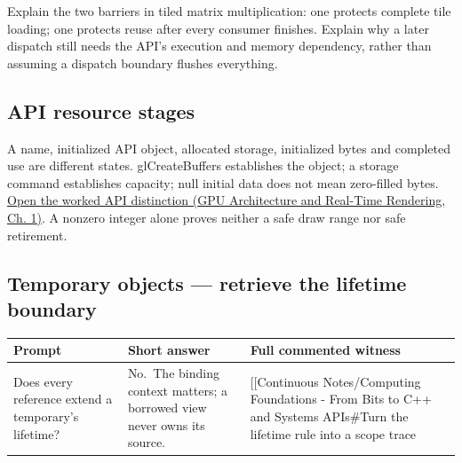 Explain the two barriers in tiled matrix multiplication: one protects complete tile loading; one protects reuse after every consumer finishes. Explain why a later dispatch still needs the API's execution and memory dependency, rather than assuming a dispatch boundary flushes everything.

\subsection{API resource stages}\label{appendix-960160274237-api-resource-stages}

A name, initialized API object, allocated storage, initialized bytes and completed use are different states. glCreateBuffers establishes the object; a storage command establishes capacity; null initial data does not mean zero-filled bytes. \href{../06-GPU-Architecture-and-Real-Time-Rendering/main.pdf\#nameddest=01-foundations-i-ch008-a-buffer-name-an-api-object-and-its-storage-are-separate}{Open the worked API distinction (GPU Architecture and Real-Time Rendering, Ch. 1)}. A nonzero integer alone proves neither a safe draw range nor safe retirement.

\subsection{Temporary objects --- retrieve the lifetime boundary}\label{appendix-960160274237-temporary-objects-retrieve-the-lifetime-boundary}

{\def\LTcaptype{none} %
\begin{longtable}[]{@{}
  >{\raggedright\arraybackslash}p{}
  >{\raggedright\arraybackslash}p{}
  >{\raggedright\arraybackslash}p{}@{}}
\toprule\noalign{}
\begin{minipage}[b]{\linewidth}\raggedright
Prompt
\end{minipage} & \begin{minipage}[b]{\linewidth}\raggedright
Short answer
\end{minipage} & \begin{minipage}[b]{\linewidth}\raggedright
Full commented witness
\end{minipage} \\
\midrule\noalign{}
\endhead
\bottomrule\noalign{}
\endlastfoot
Does every reference extend a temporary's lifetime? & No.~The binding context matters; a borrowed view never owns its source. & {[}{[}Continuous Notes/Computing Foundations - From Bits to C++ and Systems APIs\#Turn the lifetime rule into a scope trace \\
\end{longtable}
}
